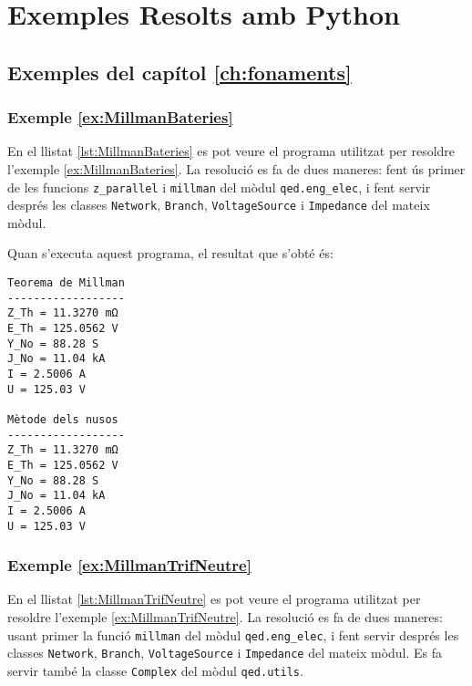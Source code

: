 \chapter{Exemples Resolts amb Python}\label{chap:python-exemples}


\section{Exemples del capítol \ref*{ch:fonaments}}

\hypertarget{exemple:MillmanBateries}{\subsection{Exemple \ref*{ex:MillmanBateries} \MillmanBateries}}

En el llistat \vref{lst:MillmanBateries} es pot veure el programa utilitzat per resoldre l'exemple \vref{ex:MillmanBateries}. La resolució es fa de dues maneres: fent ús primer de les funcions \texttt{z\_parallel} i \texttt{millman} del mòdul \texttt{qed.eng\_elec}, i fent servir després les classes \texttt{Network}, \texttt{Branch}, \texttt{VoltageSource} i \texttt{Impedance}  del mateix mòdul.


Quan s'executa aquest programa, el resultat que s'obté és:
\lstset{
	language=,
	numbers=none,
	frame=none
}
\begin{lstlisting}
Teorema de Millman
------------------
Z_Th = 11.3270 mΩ
E_Th = 125.0562 V
Y_No = 88.28 S
J_No = 11.04 kA
I = 2.5006 A
U = 125.03 V

Mètode dels nusos
------------------
Z_Th = 11.3270 mΩ
E_Th = 125.0562 V
Y_No = 88.28 S
J_No = 11.04 kA
I = 2.5006 A
U = 125.03 V
\end{lstlisting} 


\hypertarget{exemple:MillmanTrifNeutre}{\subsection{Exemple \ref*{ex:MillmanTrifNeutre} \MillmanTrifNeutre}}

En el llistat \vref{lst:MillmanTrifNeutre} es pot veure el programa utilitzat per resoldre l'exemple \vref{ex:MillmanTrifNeutre}. La resolució es fa de dues maneres: usant primer la funció \texttt{millman} del mòdul \texttt{qed.eng\_elec}, i fent servir després les classes \texttt{Network}, \texttt{Branch}, \texttt{VoltageSource} i \texttt{Impedance}  del mateix mòdul. Es fa servir també la classe \texttt{Complex} del mòdul \texttt{qed.utils}.


